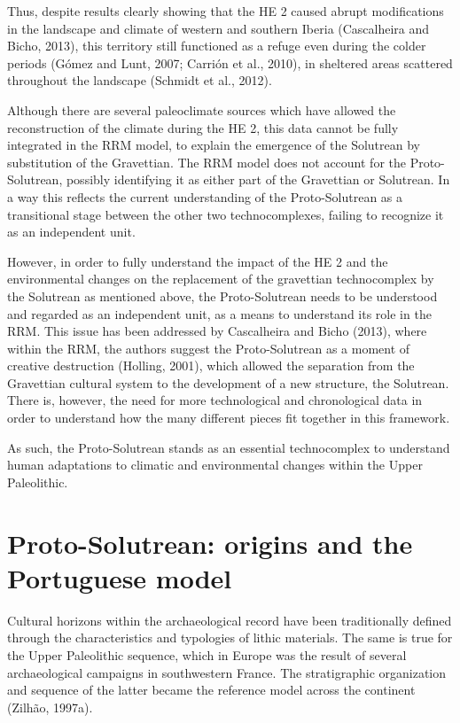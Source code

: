 \documentclass[12pt,twoside]{reedthesis}
\begin{document}
Thus, despite results clearly showing that the HE 2 caused abrupt modifications in the landscape and climate of western and southern Iberia (Cascalheira and Bicho, 2013), this territory still functioned as a refuge even during the colder periods (Gómez and Lunt, 2007; Carrión et al., 2010), in sheltered areas scattered throughout the landscape (Schmidt et al., 2012).

Although there are several paleoclimate sources which have allowed the reconstruction of the climate during the HE 2, this data cannot be fully integrated in the RRM model, to explain the emergence of the Solutrean by substitution of the Gravettian. The RRM model does not account for the Proto-Solutrean, possibly identifying it as either part of the Gravettian or Solutrean. In a way this reflects the current understanding of the Proto-Solutrean as a transitional stage between the other two technocomplexes, failing to recognize it as an independent unit.

However, in order to fully understand the impact of the HE 2 and the environmental changes on the replacement of the gravettian technocomplex by the Solutrean as mentioned above, the Proto-Solutrean needs to be understood and regarded as an independent unit, as a means to understand its role in the RRM. This issue has been addressed by Cascalheira and Bicho (2013), where within the RRM, the authors suggest the Proto-Solutrean as a moment of creative destruction (Holling, 2001), which allowed the separation from the Gravettian cultural system to the development of a new structure, the Solutrean. There is, however, the need for more technological and chronological data in order to understand how the many different pieces fit together in this framework.

As such, the Proto-Solutrean stands as an essential technocomplex to understand human adaptations to climatic and environmental changes within the Upper Paleolithic.

\hypertarget{proto-solutrean-origins-and-the-portuguese-model}{%
\section{Proto-Solutrean: origins and the Portuguese model}\label{proto-solutrean-origins-and-the-portuguese-model}}

Cultural horizons within the archaeological record have been traditionally defined through the characteristics and typologies of lithic materials. The same is true for the Upper Paleolithic sequence, which in Europe was the result of several archaeological campaigns in southwestern France. The stratigraphic organization and sequence of the latter became the reference model across the continent (Zilhão, 1997a).
\end{document}
